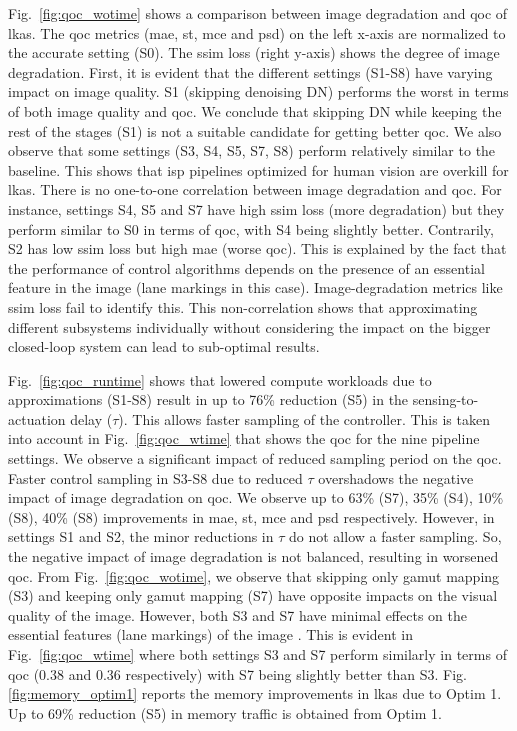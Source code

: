 \par Fig.~\ref{fig:qoc_wotime} shows a comparison between image degradation and \gls{qoc} of \gls{lkas}. The \gls{qoc} metrics (\gls{mae}, \gls{st}, \gls{mce} and \gls{psd}) on the left x-axis are normalized to the accurate setting (S0). The \gls{ssim} loss (right y-axis) shows the degree of image degradation. First, it is evident that the different settings (S1-S8) have varying impact on image quality. S1 (skipping denoising DN) performs the worst in terms of both image quality and \gls{qoc}. We conclude that skipping DN while keeping the rest of the stages (S1) is not a suitable candidate for getting better \gls{qoc}. We also observe that some settings (S3, S4, S5, S7, S8) perform relatively similar to the baseline. This shows that \gls{isp} pipelines optimized for human vision are overkill for \gls{lkas}. There is no one-to-one correlation between image degradation and \gls{qoc}. For instance, settings S4, S5 and S7 have high \gls{ssim} loss (more degradation) but they perform similar to S0 in terms of \gls{qoc}, with S4 being slightly better. Contrarily, S2 has low \gls{ssim} loss but high \gls{mae} (worse \gls{qoc}). This is explained by the fact that the performance of control algorithms depends on the presence of an essential feature in the image (lane markings in this case). Image-degradation metrics like \gls{ssim} loss fail to identify this. This non-correlation shows that approximating different subsystems individually without considering the impact on the bigger closed-loop system can lead to sub-optimal results.  

\par Fig.~\ref{fig:qoc_runtime} shows that lowered compute workloads due to approximations (S1-S8) result in up to 76\% reduction (S5) in the sensing-to-actuation delay ($\tau$). This allows faster sampling of the controller. This is taken into account in Fig.\ \ref{fig:qoc_wtime} that shows the \gls{qoc} for the nine pipeline settings. We observe a significant impact of reduced sampling period on the \gls{qoc}. Faster control sampling in S3-S8 due to reduced $\tau$ overshadows the negative impact of image degradation on \gls{qoc}. We observe up to 63\% (S7), 35\% (S4), 10\% (S8), 40\% (S8) improvements in \gls{mae}, \gls{st}, \gls{mce} and \gls{psd} respectively. However, in settings S1 and S2, the minor reductions in $\tau$ do not allow a faster sampling. So, the negative impact of image degradation is not balanced, resulting in worsened \gls{qoc}. From Fig.\ \ref{fig:qoc_wotime}, we observe that skipping only gamut mapping (S3) and keeping only gamut mapping (S7) have opposite impacts on the visual quality of the image. However, both S3 and S7 have minimal effects on the essential features (lane markings) of the image \cite{buckler}. This is evident in Fig.\ \ref{fig:qoc_wtime} where both settings S3 and S7 perform similarly in terms of \gls{qoc} (0.38 and 0.36 respectively) with S7 being slightly better than S3. 
Fig. \ref{fig:memory_optim1} reports the memory improvements in \gls{lkas} due to Optim 1. Up to 69\% reduction (S5) in memory traffic is obtained from Optim 1.

